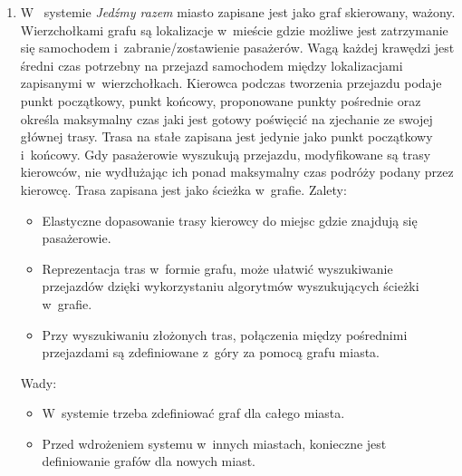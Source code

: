 \documentclass[eng,archivemode]{mgr}
\begin{document}
\begin{enumerate}[label=\textbf{Wariant \Alph*.}]
	\item W~ systemie \emph{Jedźmy razem} miasto zapisane jest jako graf skierowany, ważony. Wierzchołkami grafu są lokalizacje w~mieście gdzie możliwe jest zatrzymanie się samochodem i~zabranie/zostawienie pasażerów. Wagą każdej krawędzi jest średni czas potrzebny na przejazd samochodem między lokalizacjami zapisanymi w~wierzchołkach. Kierowca podczas tworzenia przejazdu podaje punkt początkowy, punkt końcowy, proponowane punkty pośrednie oraz określa maksymalny czas jaki jest gotowy poświęcić na zjechanie ze swojej głównej trasy. Trasa na stałe zapisana jest jedynie jako punkt początkowy i~końcowy. Gdy pasażerowie wyszukują przejazdu, modyfikowane są trasy kierowców, nie wydłużając ich ponad maksymalny czas podróży podany przez kierowcę. Trasa zapisana jest jako ścieżka w~grafie.\newline\newline
	Zalety:
	\begin{itemize}
		\item Elastyczne dopasowanie trasy kierowcy do miejsc gdzie znajdują się pasażerowie.
		\item Reprezentacja tras w~formie grafu, może ułatwić wyszukiwanie przejazdów dzięki wykorzystaniu algorytmów wyszukujących ścieżki w~grafie.
		\item Przy wyszukiwaniu złożonych tras, połączenia między pośrednimi przejazdami są zdefiniowane z~góry za pomocą grafu miasta.
	\end{itemize}
	Wady:
	\begin{itemize}
		\item W~systemie trzeba zdefiniować graf dla całego miasta.
		\item Przed wdrożeniem systemu w~innych miastach, konieczne jest definiowanie grafów dla nowych miast.
	\end{itemize}
	

\end{enumerate}
\end{document}
